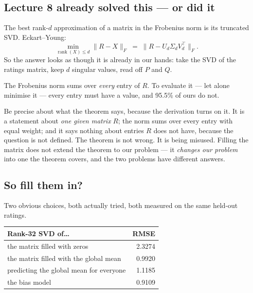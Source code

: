 \documentclass[11pt,a4paper]{article}
\begin{document}
\subsection{Lecture 8 already solved this --- or did it}

The best rank-$d$ approximation of a matrix in the Frobenius norm is its
truncated SVD. Eckart--Young:
\[
  \min_{\operatorname{rank}(X)\le d} \|R - X\|_F
  \;=\; \big\|R - U_d\Sigma_d V_d^{\top}\big\|_F .
\]
So the answer looks as though it is already in our hands: take the SVD of the
ratings matrix, keep $d$ singular values, read off $P$ and $Q$.

\begin{failbox}[title={Failure condition --- one condition, and it is not met}]
The Frobenius norm sums over \emph{every} entry of $R$. To evaluate it --- let
alone minimise it --- every entry must have a value, and 95.5\% of ours do not.
\end{failbox}

Be precise about what the theorem says, because the derivation turns on it. It
is a statement about \emph{one given matrix} $R$; the norm sums over every
entry with equal weight; and it says nothing about entries $R$ does not have,
because the question is not defined. The theorem is not wrong. It is being
misused. Filling the matrix does not extend the theorem to our problem --- it
\emph{changes our problem} into one the theorem covers, and the two problems
have different answers.

\subsection{So fill them in?}

Two obvious choices, both actually tried, both measured on the same held-out
ratings.

\begin{center}
\small
\begin{tabular}{lr}
\toprule
\textbf{Rank-32 SVD of\ldots} & \textbf{RMSE} \\
\midrule
the matrix filled with zeros           & 2.3274 \\
the matrix filled with the global mean & 0.9920 \\
\midrule
predicting the global mean for everyone & 1.1185 \\
the bias model                          & 0.9109 \\
\bottomrule
\end{tabular}
\end{center}
\end{document}
